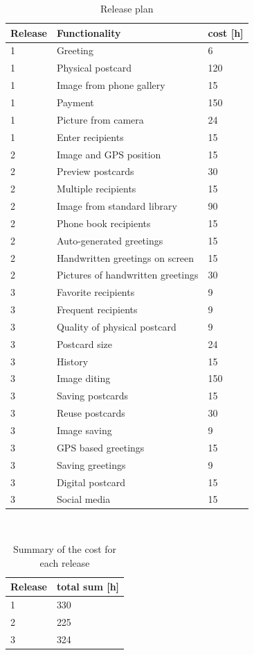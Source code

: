 \documentclass[10pt,a4paper]{article}
\begin{document}
\begin{table}[h!]
\centering
\label{table:release}
\begin{tabular}{| l | l | l | } \hline
\textbf{Release} & \textbf{Functionality} & \textbf{cost [h]} \\ \hline
1 & Greeting & 6\\ \hline
1 & Physical postcard & 120\\ \hline
1 & Image from phone gallery & 15\\ \hline
1 & Payment & 150\\ \hline
1 & Picture from camera & 24\\ \hline
1 & Enter recipients & 15\\ \hline
2 & Image and GPS position & 15\\ \hline
2 & Preview postcards & 30\\ \hline
2 & Multiple recipients & 15\\ \hline
2 & Image from standard library & 90\\ \hline
2 & Phone book recipients & 15\\ \hline
2 & Auto-generated greetings & 15\\ \hline
2 & Handwritten greetings on screen & 15\\ \hline
2 & Pictures of handwritten greetings & 30\\ \hline
3 &  Favorite recipients & 9\\ \hline
3 & Frequent recipients & 9\\ \hline
3 & Quality of physical postcard & 9\\ \hline
3 & Postcard size & 24\\ \hline
3 & History & 15\\ \hline
3 & Image diting & 150\\ \hline
3 & Saving postcards & 15\\ \hline
3 & Reuse postcards & 30\\ \hline
3 & Image saving & 9\\ \hline
3 & GPS based greetings &15\\ \hline
3 & Saving greetings & 9\\ \hline
3 & Digital postcard &15\\ \hline
3 & Social media &15\\ \hline
\end{tabular}\\
\caption{Release plan}
\end{table}


\begin{table}[h!]
\centering
\label{table:SumRelease}
\begin{tabular}{| l | l |} \hline
\textbf{Release} & \textbf{total sum [h]} \\ \hline

1 &  330 \\ \hline
2 & 225 \\ \hline
3 & 324 \\ \hline
\end{tabular}\\
\caption{Summary of the cost for each release}
\end{table}
\end{document}
